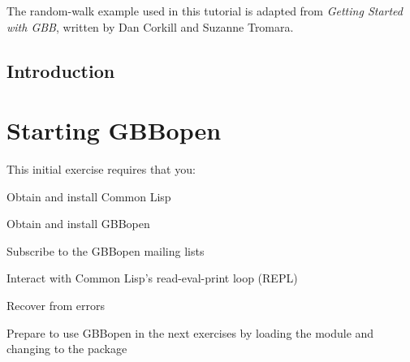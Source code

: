 \documentclass[10pt,twoside,english,pdftex]{article}
\begin{document}
\T\cleardoublepage
\W{}
\T\bgroup
\T\parskip 0pt
\tableofcontents
\T\egroup


\T\clearpage
\W{}

\W\setcounter{htmlautomenu}{1}



The random-walk example used in this tutorial is adapted from \textit{Getting
  Started with GBB\/}, written by Dan Corkill and Suzanne Tromara.


\W\begin{iftex}
  \markright{}%
  \cleardoublepage
  \setcounter{page}{1}
  \pagestyle{fancy}
  \thispagestyle{fancybottom}
  \section*{Introduction}
  \label{sec:introduction}%
  
\W\end{iftex}


\T\markright{}%
\T\pagestyle{plain}
\T\cleardoublepage
\W{}
\T\pagestyle{fancy}
\T\thispagestyle{fancybottom}
\T\renewcommand{\headrulewidth}{0pt}
\section{Starting GBBopen}
\label{sec:starting-up}%

This initial exercise requires that you:
\begin{tightitemize}
\item Obtain and install Common Lisp
\item Obtain and install GBBopen
\item Subscribe to the GBBopen mailing lists
\item Interact with Common Lisp's read-eval-print loop (REPL)
\item Recover from errors
\item Prepare to use GBBopen in the next exercises by loading the
   module and changing to the 
  package
\end{tightitemize}
\end{document}
